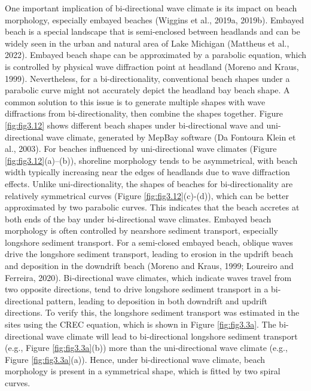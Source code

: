 One important implication of bi-directional wave climate is its impact on beach morphology, especially embayed beaches (Wiggins et al., 2019a, 2019b). Embayed beach is a special landscape that is semi-enclosed between headlands and can be widely seen in the urban and natural area of Lake Michigan (Mattheus et al., 2022). Embayed beach shape can be approximated by a parabolic equation, which is controlled by physical wave diffraction point at headland (Moreno and Kraus, 1999). Nevertheless, for a bi-directionality, conventional beach shapes under a parabolic curve might not accurately depict the headland bay beach shape. A common solution to this issue is to generate multiple shapes with wave diffractions from bi-directionality, then combine the shapes together. Figure \ref{fig:fig3.12} shows different beach shapes under bi-directional wave and uni-directional wave climate, generated by MepBay software (Da Fontoura Klein et al., 2003). For beaches influenced by uni-directional wave climates (Figure \ref{fig:fig3.12}(a)–(b)), shoreline morphology tends to be asymmetrical, with beach width typically increasing near the edges of headlands due to wave diffraction effects. Unlike uni-directionality, the shapes of beaches for bi-directionality are relatively symmetrical curves (Figure \ref{fig:fig3.12}(c)-(d)), which can be better approximated by two parabolic curves. This indicates that the beach accretes at both ends of the bay under bi-directional wave climates. Embayed beach morphology is often controlled by nearshore sediment transport, especially longshore sediment transport. For a semi-closed embayed beach, oblique waves drive the longshore sediment transport, leading to erosion in the updrift beach and deposition in the downdrift beach (Moreno and Kraus, 1999; Loureiro and Ferreira, 2020). Bi-directional wave climates, which indicate waves travel from two opposite directions, tend to drive longshore sediment transport in a bi-directional pattern, leading to deposition in both downdrift and updrift directions. To verify this, the longshore sediment transport was estimated in the sites using the CREC equation, which is shown in Figure \ref{fig:fig3.3a}. The bi-directional wave climate will lead to bi-directional longshore sediment transport (e.g., Figure \ref{fig:fig3.3a}(b)) more than the uni-directional wave climate (e.g., Figure \ref{fig:fig3.3a}(a)). Hence, under bi-directional wave climate, beach morphology is present in a symmetrical shape, which is fitted by two spiral curves. 

